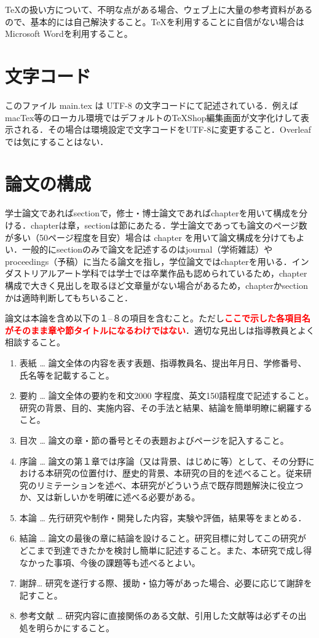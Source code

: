 \documentclass[uplatex,dvipdfmx,a4paper]{jsarticle}
\begin{document}
\TeX の扱い方について、不明な点がある場合、ウェブ上に大量の参考資料があるので、基本的には自己解決すること。\TeX を利用することに自信がない場合はMicrosoft Wordを利用すること。

\section{文字コード}
このファイル main.tex は UTF-8 の文字コードにて記述されている．例えばmacTex等のローカル環境ではデフォルトのTeXShop編集画面が文字化けして表示される．その場合は環境設定で文字コードをUTF-8に変更すること．Overleafでは気にすることはない．

\section{論文の構成}
学士論文であればsectionで，修士・博士論文であればchapterを用いて構成を分ける．chapterは章，sectionは節にあたる．学士論文であっても論文のページ数が多い（50ページ程度を目安）場合は chapter を用いて論文構成を分けてもよい．一般的にsectionのみで論文を記述するのはjournal（学術雑誌）やproceedings（予稿）に当たる論文を指し，学位論文ではchapterを用いる．インダストリアルアート学科では学士では卒業作品も認められているため，chapter構成で大きく見出しを取るほど文章量がない場合があるため，chapterかsectionかは適時判断してもちいること．

論文は本論を含め以下の１--８の項目を含むこと。ただし\textcolor{red}{\textbf{ここで示した各項目名がそのまま章や節タイトルになるわけではない}}．適切な見出しは指導教員とよく相談すること。
\begin{enumerate}
\item 表紙 … 論文全体の内容を表す表題、指導教員名、提出年月日、学修番号、氏名等を記載すること。
\item 要約 … 論文全体の要約を和文2000 字程度、英文150語程度で記述すること。研究の背景、目的、実施内容、その手法と結果、結論を簡単明瞭に網羅すること。
\item 目次 … 論文の章・節の番号とその表題およびページを記入すること。
\item 序論 … 論文の第１章では序論（又は背景、はじめに等）として、その分野における本研究の位置付け、歴史的背景、本研究の目的を述べること。従来研究のリミテーションを述べ、本研究がどういう点で既存問題解決に役立つか、又は新しいかを明確に述べる必要がある。
\item 本論 … 先行研究や制作・開発した内容，実験や評価，結果等をまとめる．
\item 結論 … 論文の最後の章に結論を設けること。研究目標に対してこの研究がどこまで到達できたかを検討し簡単に記述すること。また、本研究で成し得なかった事項、今後の課題等も述べるとよい。
\item 謝辞… 研究を遂行する際、援助・協力等があった場合、必要に応じて謝辞を記すこと。
\item 参考文献 … 研究内容に直接関係のある文献、引用した文献等は必ずその出処を明らかにすること。
\end{enumerate}
\end{document}
